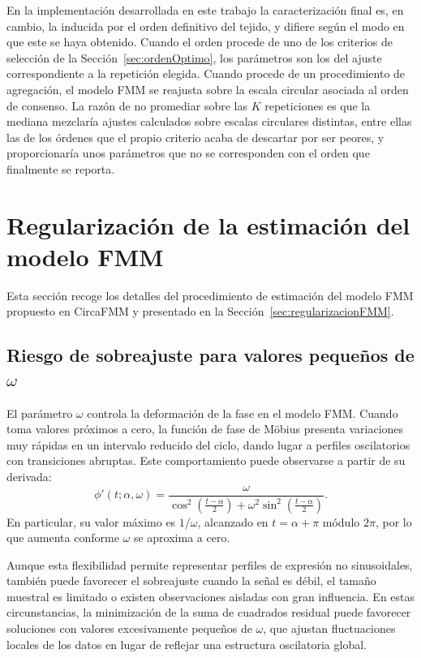 \documentclass[12pt, a4paper]{report}
\begin{document}
En la implementación desarrollada en este trabajo la caracterización final es, en cambio, la inducida por el orden definitivo del tejido, y difiere según el modo en que este se haya obtenido. Cuando el orden procede de uno de los criterios de selección de la Sección~\ref{sec:ordenOptimo}, los parámetros son los del ajuste correspondiente a la repetición elegida. Cuando procede de un procedimiento de agregación, el modelo FMM se reajusta sobre la escala circular asociada al orden de consenso. La razón de no promediar sobre las \(K\) repeticiones es que la mediana mezclaría ajustes calculados sobre escalas circulares distintas, entre ellas las de los órdenes que el propio criterio acaba de descartar por ser peores, y proporcionaría unos parámetros que no se corresponden con el orden que finalmente se reporta.

\section{Regularización de la estimación del modelo FMM}
\label{sec:RegularizacionAnexo}

Esta sección recoge los detalles del procedimiento de estimación del modelo FMM propuesto en CircaFMM \citep{Abston2026CircaFMM} y presentado en la Sección~\ref{sec:regularizacionFMM}.
\subsection{Riesgo de sobreajuste para valores pequeños de \(\omega\)}

El parámetro \(\omega\) controla la deformación de la fase en el modelo FMM. Cuando toma valores próximos a cero, la función de fase de Möbius presenta variaciones muy rápidas en un intervalo reducido del ciclo, dando lugar a perfiles oscilatorios con transiciones abruptas. Este comportamiento puede observarse a partir de su derivada:
\[
\phi'(t;\alpha,\omega)=
\frac{\omega}{
\cos^2\left(\frac{t-\alpha}{2}\right)
+\omega^2\sin^2\left(\frac{t-\alpha}{2}\right)
}.
\]
En particular, su valor máximo es \(1/\omega\), alcanzado en \(t=\alpha+\pi\) módulo \(2\pi\), por lo que aumenta conforme \(\omega\) se aproxima a cero.

Aunque esta flexibilidad permite representar perfiles de expresión no sinusoidales, también puede favorecer el sobreajuste cuando la señal es débil, el tamaño muestral es limitado o existen observaciones aisladas con gran influencia. En estas circunstancias, la minimización de la suma de cuadrados residual puede favorecer soluciones con valores excesivamente pequeños de \(\omega\), que ajustan fluctuaciones locales de los datos en lugar de reflejar una estructura oscilatoria global.
\end{document}
